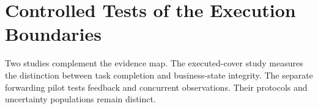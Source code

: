 \section{Controlled Tests of the Execution Boundaries}\label{sec:experiment}
Two studies complement the evidence map. The executed-cover study measures the distinction between task completion and business-state integrity. The separate forwarding pilot tests feedback and concurrent observations. Their protocols and uncertainty populations remain distinct.


